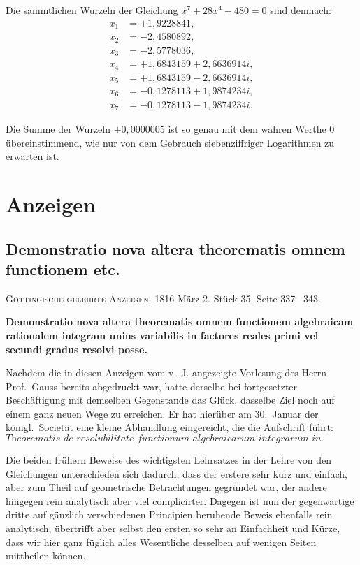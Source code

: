 \documentclass[12pt,a4paper]{article}
\newcommand{\1}{\ensuremath{\mathrlap{\,|\,}}} %
\begin{document}
Die sämmtlichen Wurzeln der Gleichung $x^7 + 28x^4 - 480 = 0$ sind demnach:
\begin{align*}
x_1 &= +1{,}9228841,\\
x_2 &= -2{,}4580892,\\
x_3 &= -2{,}5778036,\\
x_4 &= +1{,}6843159 + 2{,}6636914i,\\
x_5 &= +1{,}6843159 - 2{,}6636914i,\\
x_6 &= -0{,}1278113 + 1{,}9874234i,\\
x_7 &= -0{,}1278113 - 1{,}9874234i.
\end{align*}

Die Summe der Wurzeln $+0{,}0000005$ ist so genau mit dem wahren Werthe $0$ übereinstimmend, wie nur von dem Gebrauch siebenziffriger Logarithmen zu erwarten ist.

\newpage
\section*{Anzeigen}

\subsection*{Demonstratio nova altera theorematis omnem functionem etc.}

\noindent\textsc{Göttingische gelehrte Anzeigen.} 1816 März 2. Stück 35. Seite 337\,--\,343.

\smallskip
\noindent\textbf{Demonstratio nova altera theorematis omnem functionem algebraicam rationalem integram unius variabilis in factores reales primi vel secundi gradus resolvi posse.}

Nachdem die in diesen Anzeigen vom v.~J. angezeigte Vorlesung des Herrn Prof.~Gauss bereits abgedruckt war, hatte derselbe bei fortgesetzter Beschäftigung mit demselben Gegenstande das Glück, dasselbe Ziel noch auf einem ganz neuen Wege zu erreichen. Er hat hierüber am 30.~Januar der königl.~Societät eine kleine Abhandlung eingereicht, die die Aufschrift führt:
\[\textit{Theorematis de resolubilitate functionum algebraicarum integrarum in factores reales demonstratio tertia.}\]

Die beiden frühern Beweise des wichtigsten Lehrsatzes in der Lehre von den Gleichungen unterschieden sich dadurch, dass der erstere sehr kurz und einfach, aber zum Theil auf geometrische Betrachtungen gegründet war, der andere hingegen rein analytisch aber viel complicirter. Dagegen ist nun der gegenwärtige dritte auf gänzlich verschiedenen Principien beruhende Beweis ebenfalls rein analytisch, übertrifft aber selbst den ersten so sehr an Einfachheit und Kürze, dass wir hier ganz füglich alles Wesentliche desselben auf wenigen Seiten mittheilen können.
\end{document}

